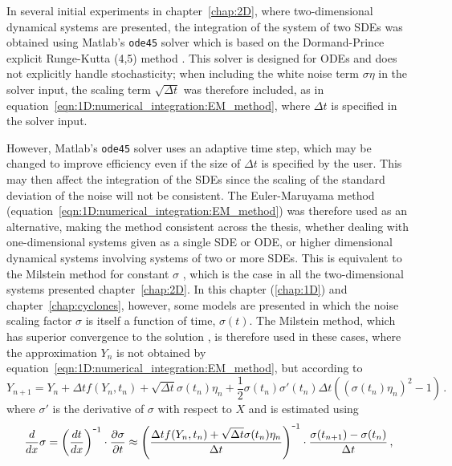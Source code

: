 {{	In several initial experiments in chapter~\ref{chap:2D}, where two-dimensional dynamical systems are presented, the integration of the system of two SDEs was obtained using Matlab's \texttt{ode45} solver \citep{matlab_ode45} which is based on the Dormand-Prince explicit Runge-Kutta (4,5) method \citep{dormand1980family}. This solver is designed for ODEs and does not explicitly handle stochasticity; when including the white noise term $\sigma\eta$ in the solver input, the scaling term $\sqrt{\Delta t}$ was therefore included, as in equation~\ref{eqn:1D:numerical_integration:EM_method}, where $\Delta t$ is specified in the solver input. 
	
	However, Matlab's \texttt{ode45} solver uses an adaptive time step, which may be changed to improve efficiency even if the size of $\Delta t$ is specified by the user. This may then affect the integration of the SDEs since the scaling of the standard deviation of the noise will not be consistent. The Euler-Maruyama method (equation~\ref{eqn:1D:numerical_integration:EM_method}) was therefore used as an alternative, making the method consistent across the thesis, whether dealing with one-dimensional systems given as a single SDE or ODE, or higher dimensional dynamical systems involving systems of two or more SDEs. This is equivalent to the Milstein method for constant $\sigma$ \citep{mackevicius2013introduction}, which is the case in all the two-dimensional systems presented chapter~\ref{chap:2D}. In this chapter (\ref{chap:1D}) and chapter~\ref{chap:cyclones}, however, some models are presented in which the noise scaling factor $\sigma$ is itself a function of time, $\sigma(t)$. The Milstein method, which has superior convergence to the solution \citep{kloeden1999_SDEs}, is therefore used in these cases, where the approximation $Y_n$ is not obtained by equation~\ref{eqn:1D:numerical_integration:EM_method}, but according to 
		\begin{equation}
		\label{eqn:1D:numerical_integration:Milstein}
			Y_{n+1} = Y_n + \Delta t f(Y_n,t_n) + \sqrt{\Delta t}\sigma(t_n)\eta_n + \frac{1}{2}\sigma(t_n)\sigma'(t_n)\Delta t\left((\sigma(t_n) \eta_n)^2-1\right)\,.
		\end{equation}
	where $\sigma'$ is the derivative of $\sigma$ with respect to $X$ and is estimated using 
		\begin{equation}
		\label{eqn:1D:numerical:sigmadash}
			\frac{d}{dx}\sigma = \left(\frac{dt}{dx}\right)^{\m1}\cdot\frac{\partial \sigma}{\partial t} \approx \left(\frac{\Delta t f(Y_n,t_n) + \sqrt{\Delta t}\sigma(t_n)\eta_n}{\Delta t}\right)^{\m1} \cdot \frac{\sigma(t_{n+1})- \sigma(t_n)}{\Delta t}\,,

\end{equation}}}
